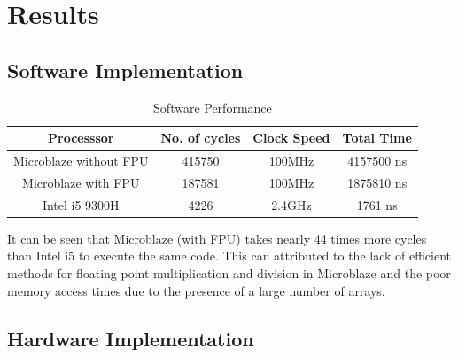 \documentclass[11pt, a4paper]{article}
\begin{document}
\section{Results}

\subsection{Software Implementation}
{
\renewcommand{\arraystretch}{1.2}
\begin{table}[htbp]
    \centering
    \begin{tabular}{|c|c|c|c|}
    \hline
        Processsor & No. of cycles & Clock Speed & Total Time \\ \hline
        Microblaze without FPU & 415750 & 100MHz & 4157500 ns \\ \hline
        Microblaze with FPU & 187581 & 100MHz & 1875810 ns \\ \hline
        Intel i5 9300H & 4226 & 2.4GHz & 1761 ns \\
    \hline
    \end{tabular}
    \caption{Software Performance}
    \label{tab:my_label}
\end{table}
}
It can be seen that Microblaze (with FPU) takes nearly 44 times more cycles than Intel i5 to execute the same code. This can attributed to the lack of efficient methods for floating point multiplication and division in Microblaze and the poor memory access times due to the presence of a large number of arrays.
{
\renewcommand{\arraystretch}{1.2}
\FloatBarrier
\subsection{Hardware Implementation}
\begin{table}[htbp]
    \centering
    \caption{Hardware Performance(@100MHz)}
    \label{tab:my_label}
\end{table}
}
\end{document}

